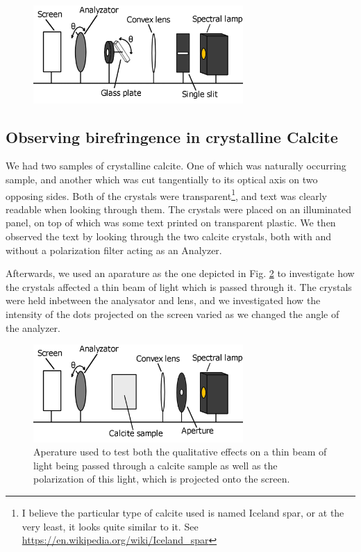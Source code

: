 \documentclass[11pt,a4paper, twocolumn]{article}
\begin{document}
    \begin{figure}[H]
      \center
      \includegraphics[width=8cm]{scripts/figs/diagram_4.png}
      \caption{}
      \label{fig:glassplate}
    \end{figure}

  \subsection{Observing birefringence in crystalline Calcite}
    We had two samples of crystalline calcite. One of which was naturally occurring sample, and another which was cut tangentially to its optical axis on two opposing sides. Both of the crystals were transparent\footnote{I believe the particular type of calcite used is named Iceland spar, or at the very least, it looks quite similar to it. See \url{https://en.wikipedia.org/wiki/Iceland_spar}}, and text was clearly readable when looking through them. The crystals were placed on an illuminated panel, on top of which was some text printed on transparent plastic. We then observed the text by looking through the two calcite crystals, both with and without a polarization filter acting as an Analyzer. 

    Afterwards, we used an aparature as the one depicted in Fig. \ref{fig:calcite} to investigate how the crystals affected a thin beam of light which is passed through it. The crystals were held inbetween the analysator and lens, and we investigated how the intensity of the dots projected on the screen varied as we changed the angle of the analyzer.

    \begin{figure}[H]
      \center
      \includegraphics[width=8cm]{scripts/figs/diagram_5.png}
      \caption{Aperature used to test both the qualitative effects on a thin beam of light being passed through a calcite sample as well as the polarization of this light, which is projected onto the screen.}
      \label{fig:calcite}
    \end{figure}
\end{document}
